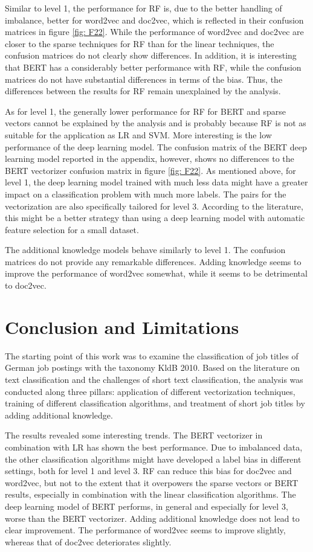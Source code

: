 \documentclass[12pt, a4paper, titlepage]{article}
\begin{document}
Similar to level 1, the performance for \ac{RF} is, due to the better handling of imbalance, better for word2vec and doc2vec, which is reflected in their confusion matrices in figure \ref{fig: F22}. While the performance of word2vec and doc2vec are closer to the sparse techniques for \ac{RF} than for the linear techniques, the confusion matrices do not clearly show differences. In addition, it is interesting that \ac{BERT} has a considerably better performance with \ac{RF}, while the confusion matrices do not have substantial differences in terms of the bias. Thus, the differences between the results for \ac{RF} remain unexplained by the analysis.

As for level 1, the generally lower performance for \ac{RF} for \ac{BERT} and sparse vectors cannot be explained by the analysis and is probably because \ac{RF} is not as suitable for the application as \ac{LR} and \ac{SVM}. More interesting is the low performance of the deep learning model. The confusion matrix of the \ac{BERT} deep learning model reported in the appendix, however, shows no differences to the \ac{BERT} vectorizer confusion matrix in figure \ref{fig: F22}. As mentioned above, for level 1, the deep learning model trained with much less data might have a greater impact on a classification problem with much more labels. The pairs for the vectorization are also specifically tailored for level 3. According to the literature, this might be a better strategy than using a deep learning model with automatic feature selection for a small dataset. 

The additional knowledge models behave similarly to level 1. The confusion matrices do not provide any remarkable differences. Adding knowledge seems to improve the performance of word2vec somewhat, while it seems to be detrimental to doc2vec.


\section{Conclusion and Limitations}
The starting point of this work was to examine the classification of job titles of German job postings with the taxonomy \ac{KldB} 2010. Based on the literature on text classification and the challenges of short text classification, the analysis was conducted along three pillars: application of different vectorization techniques, training of different classification algorithms, and treatment of short job titles by adding additional knowledge. 

The results revealed some interesting trends. The \ac{BERT} vectorizer in combination with \ac{LR} has shown the best performance. Due to imbalanced data, the other classification algorithms might have developed a label bias in different settings, both for level 1 and level 3. \ac{RF} can reduce this bias for doc2vec and word2vec, but not to the extent that it overpowers the sparse vectors or \ac{BERT} results, especially in combination with the linear classification algorithms. The deep learning model of \ac{BERT} performs, in general and especially for level 3, worse than the \ac{BERT} vectorizer. Adding additional knowledge does not lead to clear improvement. The performance of word2vec seems to improve slightly, whereas that of doc2vec deteriorates slightly. 
\end{document}
